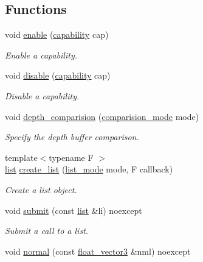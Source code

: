 \subsection*{Functions}
\begin{DoxyCompactItemize}
\item 
void \hyperlink{namespaceglpp_ad1970949b2ced11cdacaf1c8b54ef0c3}{enable} (\hyperlink{namespaceglpp_a1b0f7d2f17d11ae11a12d44571612832}{capability} cap)
\begin{DoxyCompactList}\small\item\em Enable a capability. \end{DoxyCompactList}\item 
void \hyperlink{namespaceglpp_a02ef6b3510b6a60c01cf0c35a1311a35}{disable} (\hyperlink{namespaceglpp_a1b0f7d2f17d11ae11a12d44571612832}{capability} cap)
\begin{DoxyCompactList}\small\item\em Disable a capability. \end{DoxyCompactList}\item 
void \hyperlink{namespaceglpp_ac6b2c7dc6e9ed88cc51a099ddb9169fc}{depth\+\_\+comparision} (\hyperlink{namespaceglpp_aa44c8e6b80225228552f747c73ba7186}{comparision\+\_\+mode} mode)
\begin{DoxyCompactList}\small\item\em Specify the depth buffer comparison. \end{DoxyCompactList}\item 
{\footnotesize template$<$typename F $>$ }\\\hyperlink{classglpp_1_1list}{list} \hyperlink{namespaceglpp_ad2935327dd1a54de819bbab69ce44119}{create\+\_\+list} (\hyperlink{namespaceglpp_ae04b58b8004d97440233b5c65fe75748}{list\+\_\+mode} mode, F callback)
\begin{DoxyCompactList}\small\item\em Create a list object. \end{DoxyCompactList}\item 
void \hyperlink{namespaceglpp_ac7ca6d6fd3cefa6019165db681480332}{submit} (const \hyperlink{classglpp_1_1list}{list} \&li) noexcept
\begin{DoxyCompactList}\small\item\em Submit a call to a list. \end{DoxyCompactList}\item 
void \hyperlink{namespaceglpp_a723b4eebcf127793aa9d0956f7f18507}{normal} (const \hyperlink{namespaceglpp_a3fa7b207a8b7dba583fb22731a616d73}{float\+\_\+vector3} \&nml) noexcept

\end{DoxyCompactItemize}
